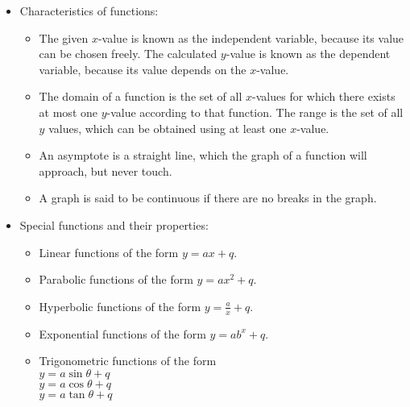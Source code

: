 
\begin{itemize}[noitemsep]
\item Characteristics of functions: 
\begin{itemize}[noitemsep]
\item The given $x$-value is known as the independent variable, because its value can be chosen freely. The calculated $y$-value is known as the dependent variable, because its value depends on the  $x$-value.
\item The domain of a function is the set of all  $x$-values for which there exists at most one $y$-value according to that function. The range is the set of all $y$ values, which can be obtained using at least one $x$-value.
\item An asymptote is a straight  line, which the graph of a function will approach, but never touch.
\item A graph is said to be continuous if there are no breaks in the graph. 
\end{itemize}

\item Special functions and their properties:
  \begin{itemize}[noitemsep]
  \item Linear functions of the form $y=ax+q$.
  \item Parabolic functions of the form $y=a{x}^{2}+q$. 
  \item Hyperbolic functions of the form $y=\frac{a}{x}+q$. 
  \item Exponential functions of the form $y=a{b}^{x}+q$. 
  \item Trigonometric functions of the form \\$y=a\sin\theta+q$ \\$y=a\cos\theta+q$\\ $y=a\tan\theta+q$ 
  \end{itemize}
\end{itemize}

